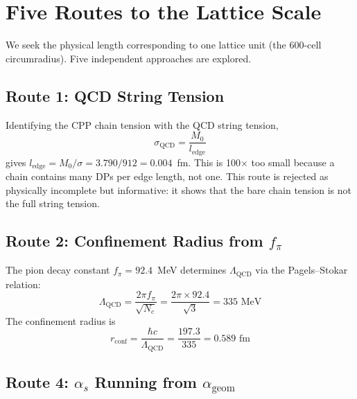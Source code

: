 \documentclass[12pt,a4paper]{article}
\begin{document}
\section{Five Routes to the Lattice Scale}

We seek the physical length corresponding to one lattice unit (the 600-cell circumradius). Five independent approaches are explored.

\subsection{Route 1: QCD String Tension}

Identifying the CPP chain tension with the QCD string tension,
\begin{equation}
\sigma_{\mathrm{QCD}} = \frac{M_0}{l_{\mathrm{edge}}}
\end{equation}
gives $l_{\mathrm{edge}} = M_0/\sigma = 3.790/912 = 0.004$~fm. This is 100$\times$ too small because a chain contains many DPs per edge length, not one. This route is rejected as physically incomplete but informative: it shows that the bare chain tension is not the full string tension.

\subsection{Route 2: Confinement Radius from $f_\pi$}

The pion decay constant $f_\pi = 92.4$~MeV determines $\Lambda_{\mathrm{QCD}}$ via the Pagels--Stokar relation:
\begin{equation}
\Lambda_{\mathrm{QCD}} = \frac{2\pi f_\pi}{\sqrt{N_c}} = \frac{2\pi \times 92.4}{\sqrt{3}} = 335 \text{ MeV}
\end{equation}
The confinement radius is
\begin{equation}
r_{\mathrm{conf}} = \frac{\hbar c}{\Lambda_{\mathrm{QCD}}} = \frac{197.3}{335} = 0.589 \text{ fm}
\label{eq:route2}
\end{equation}

\subsection{Route 4: $\alpha_s$ Running from $\alpha_{\mathrm{geom}}$}
\label{sec:route4}
\end{document}
